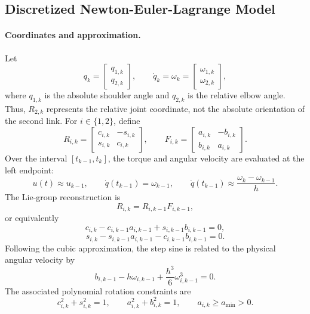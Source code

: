 \subsection{Discretized Newton-Euler-Lagrange Model}
\label{appendix:discretized_newton_euler_lagrange_model}

\paragraph{Coordinates and approximation.}
Let
\[
q_k=
\begin{bmatrix}q_{1,k}\\q_{2,k}\end{bmatrix},
\qquad
\dot q_k=\omega_k=
\begin{bmatrix}\omega_{1,k}\\\omega_{2,k}\end{bmatrix},
\]
where $q_{1,k}$ is the absolute shoulder angle and $q_{2,k}$ is the
relative elbow angle. Thus, $R_{2,k}$ represents the relative joint
coordinate, not the absolute orientation of the second link. For
$i\in\{1,2\}$, define
\[
R_{i,k}=
\begin{bmatrix}
c_{i,k}&-s_{i,k}\\
s_{i,k}&c_{i,k}
\end{bmatrix},
\qquad
F_{i,k}=
\begin{bmatrix}
a_{i,k}&-b_{i,k}\\
b_{i,k}&a_{i,k}
\end{bmatrix}.
\]
Over the interval $[t_{k-1},t_k]$, the torque and angular velocity are
evaluated at the left endpoint:
\[
u(t)\approx u_{k-1},\qquad
\dot q(t_{k-1})=\omega_{k-1},\qquad
\ddot q(t_{k-1})
\approx\frac{\omega_k-\omega_{k-1}}{h}.
\]
The Lie-group reconstruction is
\[
R_{i,k}=R_{i,k-1}F_{i,k-1},
\]
or equivalently
\[
c_{i,k}-c_{i,k-1}a_{i,k-1}+s_{i,k-1}b_{i,k-1}=0,
\]
\[
s_{i,k}-s_{i,k-1}a_{i,k-1}-c_{i,k-1}b_{i,k-1}=0.
\]
Following the cubic approximation, the step sine is related
to the physical angular velocity by
\[
b_{i,k-1}
-h\omega_{i,k-1}
+\frac{h^3}{6}\omega_{i,k-1}^3=0.
\]
The associated polynomial rotation constraints are
\[
c_{i,k}^2+s_{i,k}^2=1,\qquad
a_{i,k}^2+b_{i,k}^2=1,\qquad
a_{i,k}\geq a_{\min}>0.
\]

